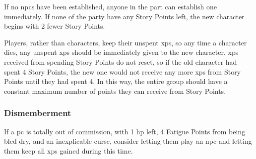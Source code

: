 \begin{multicols}{2}
If no \glspl{npc} have been established, anyone in the part can establish one immediately.
If none of the party have any Story Points left, the new character begins with 2 fewer Story Points.

Players, rather than characters, keep their unspent \glspl{xp}, so any time a character dies, any unspent \glspl{xp} should be immediately given to the new character.
\Glspl{xp} received from spending Story Points do not reset, so if the old character had spent 4 Story Points, the new one would not receive any more \glspl{xp} from Story Points until they had spent 4.
In this way, the entire group should have a constant maximum number of points they can receive from Story Points.

\subsubsection{Dismemberment}

If a \gls{pc} is totally out of commission, with 1 \gls{hp} left, 4 Fatigue Points from being bled dry, and an inexplicable curse, consider letting them play an \gls{npc} and letting them keep all \glspl{xp} gained during this time.

\end{multicols}

